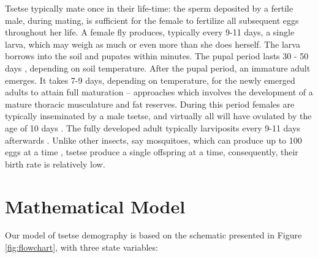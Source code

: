 Tsetse typically mate once in their life-time: the sperm deposited by a fertile male, during mating, is sufficient for the female to fertilize all subsequent eggs throughout her life. A female fly produces, typically every 9-11 days, a single larva, which may weigh as much or even more than she does herself.  The larva borrows into the soil and pupates within minutes. The pupal period lasts 30 - 50 days \cite{PhelpsR.J.&Burrows}, depending on soil temperature. After the pupal period, an immature adult emerges. It takes 7-9 days, depending on temperature, for the newly emerged adults to attain full maturation – approaches which involves the development of a mature thoracic musculature and fat reserves. During this period females are typically inseminated by a male tsetse, and virtually all will have ovulated by the age of 10 days \cite{Hargrove2012c}. The fully developed adult typically larviposits every 9-11 days afterwards \cite{Hargrove2019}. Unlike other insects, say mosquitoes, which can produce up to 100 eggs at a time \cite{Clemons2010}, tsetse produce a single offspring at a time, consequently, their birth rate is relatively low. 




\section{Mathematical Model}

Our model of tsetse demography is based on the schematic presented in Figure \ref{fig:flowchart}, with three state variables:

